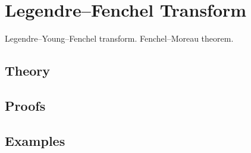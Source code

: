 
\section{Legendre–Fenchel Transform}
\label{sec:2.4.04-legendre-fenchel}

\begin{ticket}
Legendre–Young–Fenchel transform. Fenchel–Moreau theorem.
\end{ticket}

\subsection*{Theory}

\subsection*{Proofs}

\subsection*{Examples}
